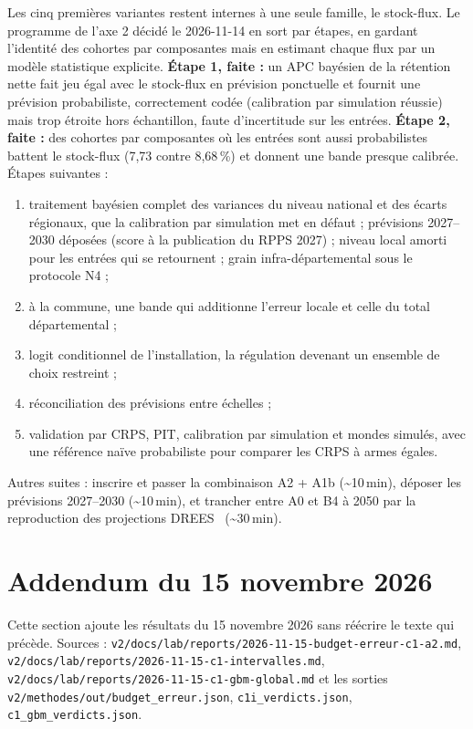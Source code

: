 \documentclass[11pt]{article}
\begin{document}
Les cinq premières variantes restent internes à une seule famille, le stock-flux. Le programme de
l'axe 2 décidé le 2026-11-14 en sort par étapes, en gardant l'identité des cohortes par composantes
mais en estimant chaque flux par un modèle statistique explicite. \textbf{Étape 1, faite :} un APC
bayésien de la rétention nette fait jeu égal avec le stock-flux en prévision ponctuelle et fournit une
prévision probabiliste, correctement codée (calibration par simulation réussie) mais trop étroite hors
échantillon, faute d'incertitude sur les entrées. \textbf{Étape 2, faite :} des cohortes par
composantes où les entrées sont aussi probabilistes battent le stock-flux (7,73 contre
8,68\,\%\mesure) et donnent une bande presque calibrée. Étapes suivantes :
\begin{enumerate}
  \item traitement bayésien complet des variances du niveau national et des écarts régionaux, que la
        calibration par simulation met en défaut ; prévisions 2027--2030 déposées (score à la
        publication du RPPS 2027) ; niveau local amorti
        pour les entrées qui se retournent ; grain infra-départemental sous le protocole N4 ;
  \item à la commune, une bande qui additionne l'erreur locale et celle du total départemental ;
  \item logit conditionnel de l'installation, la régulation devenant un ensemble de choix restreint ;
  \item réconciliation des prévisions entre échelles ;
  \item validation par CRPS, PIT, calibration par simulation et mondes simulés, avec une référence
        naïve probabiliste pour comparer les CRPS à armes égales.
\end{enumerate}
Autres suites : inscrire et passer la combinaison A2 + A1b (\textasciitilde{}10\,min), déposer les
prévisions 2027--2030 (\textasciitilde{}10\,min), et trancher entre A0 et B4 à 2050 par la
reproduction des projections DREES~\cite{drees2021dd76} (\textasciitilde{}30\,min).

\section{Addendum du 15 novembre 2026}
\label{sec:addendum}
Cette section ajoute les résultats du 15 novembre 2026 sans réécrire le texte qui précède. Sources :
\texttt{v2/docs/lab/reports/2026-11-15-budget-erreur-c1-a2.md},
\texttt{v2/docs/lab/reports/2026-11-15-c1-intervalles.md},
\texttt{v2/docs/lab/reports/2026-11-15-c1-gbm-global.md} et les sorties
\texttt{v2/methodes/out/budget\_erreur.json}, \texttt{c1i\_verdicts.json}, \texttt{c1\_gbm\_verdicts.json}.
\end{document}
